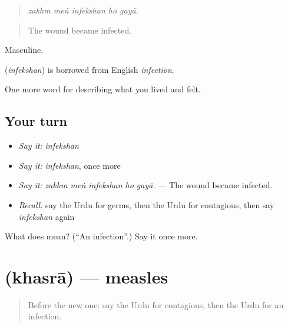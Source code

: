 \begin{quote}
    
\end{quote}

\begin{quote}
\emph{zakhm meṅ infekshan ho gayā.}
\end{quote}

\begin{quote}
The wound became infected.
\end{quote}

Masculine.

\begin{cousinweb}
\textbf{} (\emph{infekshan}) is borrowed from English \emph{infection}.
\end{cousinweb}

\begin{grammarlens}[title={What you've built}]
One more word for describing what you lived and felt.
\end{grammarlens}

\subsection*{Your turn}
\begin{itemize}
\raggedright
  \item \emph{Say it:} \emph{infekshan}
  \item \emph{Say it:} \emph{infekshan}, once more
  \item \emph{Say it:} \emph{zakhm meṅ infekshan ho gayā.} — The wound became infected.
  \item \emph{Recall:} say the Urdu for germs, then the Urdu for contagious, then say \emph{infekshan} again
\end{itemize}

\begin{tcolorbox}[breakable,colback=teal!4,colframe=teal!35!black,title={Before you move on}]
What does  mean? (\textquotedblleft{}An infection\textquotedblright{}.) Say it once more.
\end{tcolorbox}
\section[\texorpdfstring{\ur{خسرہ} (khasrā)}{خسرہ (khasrā)}]{ (khasrā) — measles}

\label{lesson:UR-C474-khasra}



\begin{quote}
Before the new one: say the Urdu for contagious, then the Urdu for an infection.
\end{quote}

